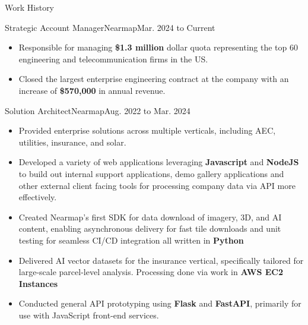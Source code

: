 \documentclass[]{mcdowellcv}
\begin{document}
	\begin{cvsection}{Work History}
		\begin{cvsubsection}{Strategic Account Manager}{Nearmap}{Mar. 2024 to Current}
			\begin{itemize}
				\item Responsible for managing \textbf{\$1.3 million} dollar quota representing the top 60 engineering and telecommunication firms in the US. 
				\item Closed the largest enterprise engineering contract at the company with an increase of \textbf{\$570,000} in annual revenue. 
			\end{itemize}
		\end{cvsubsection}
		
		\begin{cvsubsection}{Solution Architect}{Nearmap}{Aug. 2022 to Mar. 2024}
		\begin{itemize}
                \item Provided enterprise solutions across multiple verticals, including AEC, utilities, insurance, and solar.
                 \item Developed a variety of web applications leveraging \textbf{Javascript} and \textbf{NodeJS} to build out internal support applications, demo gallery applications and other external client facing tools for processing company data via API more effectively.  
                \item Created Nearmap's first SDK for data download of imagery, 3D, and AI content, enabling asynchronous delivery for fast tile downloads and unit testing for seamless CI/CD integration all written in \textbf{Python}
                \item Delivered AI vector datasets for the insurance vertical, specifically tailored for large-scale parcel-level analysis. Processing done via work in \textbf{AWS EC2 Instances} 
                \item Conducted general API prototyping using \textbf{Flask} and \textbf{FastAPI}, primarily for use with JavaScript front-end services.
            \end{itemize}
		\end{cvsubsection}
		

\end{cvsection}
\end{document}
